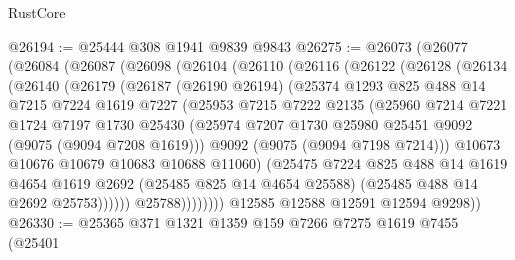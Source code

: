 \begin{lexlean}{RustCore}
\begin{coremodule}
@26194 := @25444 @308 @1941 @9839 @9843
@26275 := @26073
    (@26077
      (@26084
        (@26087
          (@26098
            (@26104
              (@26110
                (@26116
                  (@26122
                    (@26128
                      (@26134
                        (@26140
                          (@26179
                            (@26187
                              (@26190 @26194)
                              (@25374
                                @1293
                                @825
                                @488
                                @14
                                @7215
                                @7224
                                @1619
                                @7227
                                (@25953
                                  @7215
                                  @7222
                                  @2135
                                  (@25960
                                    @7214
                                    @7221
                                    @1724
                                    @7197
                                    @1730
                                    @25430
                                    (@25974
                                      @7207
                                      @1730
                                      @25980
                                      @25451
                                      @9092
                                      (@9075 (@9094 @7208 @1619)))
                                    @9092
                                    (@9075 (@9094 @7198 @7214)))
                                  @10673
                                  @10676
                                  @10679
                                  @10683
                                  @10688
                                  @11060)
                                (@25475
                                  @7224
                                  @825
                                  @488
                                  @14
                                  @1619
                                  @4654
                                  @1619
                                  @2692
                                  (@25485 @825 @14 @4654 @25588)
                                  (@25485 @488 @14 @2692 @25753))))))
                        @25788))))))))
        @12585
        @12588
        @12591
        @12594
        @9298))
@26330 := @25365
    @371
    @1321
    @1359
    @159
    @7266
    @7275
    @1619
    @7455
    (@25401

\end{coremodule}
\end{lexlean}
